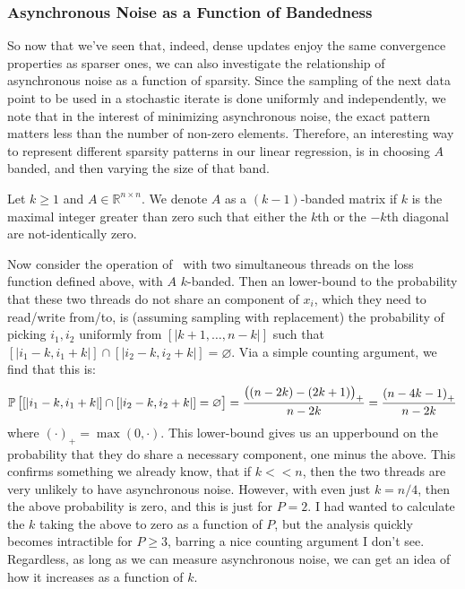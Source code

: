 \subsubsection{Asynchronous Noise as a Function of Bandedness}
So now that we've seen that, indeed, dense updates enjoy the same convergence
properties as sparser ones, we can also investigate the relationship of
asynchronous noise as a function of sparsity. Since the sampling of the next
data point to be used in a stochastic iterate is done uniformly and
independently, we note that in the interest of minimizing asynchronous noise,
the exact pattern matters less than the number of non-zero elements. Therefore,
an interesting way to represent different sparsity patterns in our linear
regression, is in choosing $A$ banded, and then varying the size of that band.
\begin{definition}
  Let $k \geq 1$ and $A \in \mathbb{R}^{n \times n}$. We denote $A$ as
  a $(k-1)$-banded matrix if $k$ is the maximal integer greater than zero such
  that either the $k$th or the $-k$th diagonal are not-identically zero.
\end{definition}
Now consider the operation of \hogwild\ with two simultaneous threads on the
loss function defined above, with $A$ $k$-banded. Then an lower-bound to the
probability that these two threads do not share an component of $x_i$, which
they need to read/write from/to, is (assuming sampling with replacement) the
probability of picking $i_1, i_2$ uniformly from $[|k+1, \dots, n-k|]$ such that
$[|i_1-k, i_1+k|] \cap [|i_2-k, i_2+k|] = \varnothing$. Via a simple counting
argument, we find that this is:
\[
  \mathbb{P}\left[[|i_1-k, i_1+k|] \cap [|i_2-k, i_2+k|] = \varnothing\right]
  =
  \frac{\left((n-2k)-(2k+1)\right)_+}{n-2k}
  =
  \frac{\left(n-4k-1\right)_+}{n-2k}
\]
where $(\cdot)_+ = \max(0, \cdot)$. This lower-bound gives us an upperbound on
the probability that they do share a necessary component, one minus the above.
This confirms something we already know, that if $k << n$, then the two threads
are very unlikely to have asynchronous noise. However, with even just $k = n/4$,
then the above probability is zero, and this is just for $P = 2$. I had wanted
to calculate the $k$ taking the above to zero as a function of $P$, but the
analysis quickly becomes intractible for $P \geq 3$, barring a nice counting
argument I don't see. Regardless, as long as we can measure asynchronous noise,
we can get an idea of how it increases as a function of $k$.

